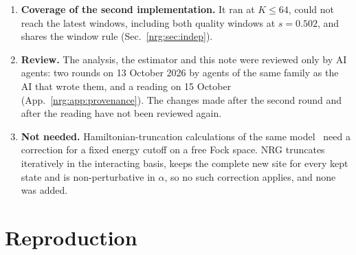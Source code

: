 \begin{enumerate}
  after the comparison with the $\varepsilon$ series.
\item \textbf{Coverage of the second implementation.} It ran at $K\le64$, could not reach the latest windows, including both quality
  windows at $s=0.502$, and shares the window rule (Sec.~\ref{nrg:sec:indep}).
\item \textbf{Review.} The analysis, the estimator and this note were reviewed only by AI agents: two rounds on 13 October 2026 by
  agents of the same family as the AI that wrote them, and a reading on 15 October (App.~\ref{nrg:app:provenance}). The changes made after
  the second round and after the reading have not been reviewed again.
\item \textbf{Not needed.} Hamiltonian-truncation calculations of the same model~\cite{nrg:Paper,nrg:HTnote} need a correction for a fixed energy cutoff on a free
  Fock space. NRG truncates iteratively in the interacting basis, keeps the complete new site for every kept state and is
  non-perturbative in $\alpha$, so no such correction applies, and none was added.
\end{enumerate}

\section{Reproduction}\label{nrg:sec:repro}
